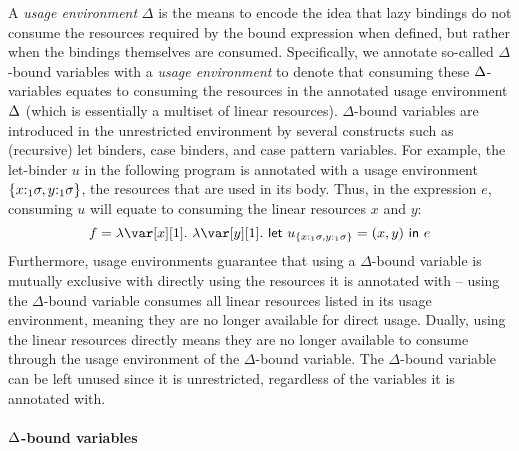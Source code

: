 \documentclass[acmsmall,review,anonymous,screen]{acmart}
\newcommand{\llet}[2]{\mathsf{let}~#1~\mathsf{in}~#2}
\begin{document}
A \emph{usage environment} $\Delta$ is the means to encode the idea that lazy
bindings do not consume the resources required by the bound expression when
defined, but rather when the bindings themselves are consumed.
Specifically, we annotate so-called $\Delta$-bound variables with a \emph{usage
environment} to denote that consuming these $\Delta$-variables equates to consuming the
resources in the annotated usage environment $\Delta$ (which is essentially a
multiset of linear resources).
%
$\Delta$-bound variables are introduced in the unrestricted environment by
several constructs such as (recursive) let binders, case binders, and case
pattern variables.
%
For example, the let-binder $u$ in the following program is annotated with a
usage environment $\{x{:}_1\sigma,y{:}_1\sigma\}$, the resources that are used in its
body. Thus, in the expression $e$, consuming $u$ will equate to consuming the
linear resources $x$ and $y$:
\[
f = \lambda \xl.~\lambda \y[1].~\llet{u_{\{x:_1\s,y:_1\s\}} = (x,y)}{e}
\]
Furthermore, usage environments guarantee that using a $\Delta$-bound variable
is mutually exclusive with directly using the resources it is annotated with --
using the $\Delta$-bound variable consumes all linear resources listed in its
usage environment, meaning they are no longer available for direct usage.
Dually, using the linear resources directly means they are no longer available
to consume through the usage environment of the $\Delta$-bound variable. The
$\Delta$-bound variable can be left unused since it is unrestricted, regardless
of the variables it is annotated with.

%
%

\paragraph{\texorpdfstring{$\Delta$}{Delta}-bound variables}
\end{document}

